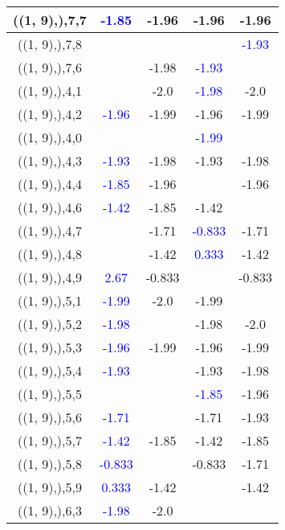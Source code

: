 \documentclass{article}
\begin{document}
\begin{center}
\begin{longtable}{|c|c|c|c|c|}
        	\hline
        	((1, 9),),7,7& \textcolor{blue}{-1.85}&-1.96&-1.96&-1.96\\
        	\hline
        	((1, 9),),7,8&&&& \textcolor{blue}{-1.93}\\
        	\hline
        	((1, 9),),7,6&&-1.98& \textcolor{blue}{-1.93}&\\
        	\hline
        	((1, 9),),4,1&&-2.0& \textcolor{blue}{-1.98}&-2.0\\
        	\hline
        	((1, 9),),4,2& \textcolor{blue}{-1.96}&-1.99&-1.96&-1.99\\
        	\hline
        	((1, 9),),4,0&&& \textcolor{blue}{-1.99}&\\
        	\hline
        	((1, 9),),4,3& \textcolor{blue}{-1.93}&-1.98&-1.93&-1.98\\
        	\hline
        	((1, 9),),4,4& \textcolor{blue}{-1.85}&-1.96&&-1.96\\
        	\hline
        	((1, 9),),4,6& \textcolor{blue}{-1.42}&-1.85&-1.42&\\
        	\hline
        	((1, 9),),4,7&&-1.71& \textcolor{blue}{-0.833}&-1.71\\
        	\hline
        	((1, 9),),4,8&&-1.42& \textcolor{blue}{0.333}&-1.42\\
        	\hline
        	((1, 9),),4,9& \textcolor{blue}{2.67}&-0.833&&-0.833\\
        	\hline
        	((1, 9),),5,1& \textcolor{blue}{-1.99}&-2.0&-1.99&\\
        	\hline
        	((1, 9),),5,2& \textcolor{blue}{-1.98}&&-1.98&-2.0\\
        	\hline
        	((1, 9),),5,3& \textcolor{blue}{-1.96}&-1.99&-1.96&-1.99\\
        	\hline
        	((1, 9),),5,4& \textcolor{blue}{-1.93}&&-1.93&-1.98\\
        	\hline
        	((1, 9),),5,5&&& \textcolor{blue}{-1.85}&-1.96\\
        	\hline
        	((1, 9),),5,6& \textcolor{blue}{-1.71}&&-1.71&-1.93\\
        	\hline
        	((1, 9),),5,7& \textcolor{blue}{-1.42}&-1.85&-1.42&-1.85\\
        	\hline
        	((1, 9),),5,8& \textcolor{blue}{-0.833}&&-0.833&-1.71\\
        	\hline
        	((1, 9),),5,9& \textcolor{blue}{0.333}&-1.42&&-1.42\\
        	\hline
        	((1, 9),),6,3& \textcolor{blue}{-1.98}&-2.0&&\\

\end{longtable}
\end{center}
\end{document}
